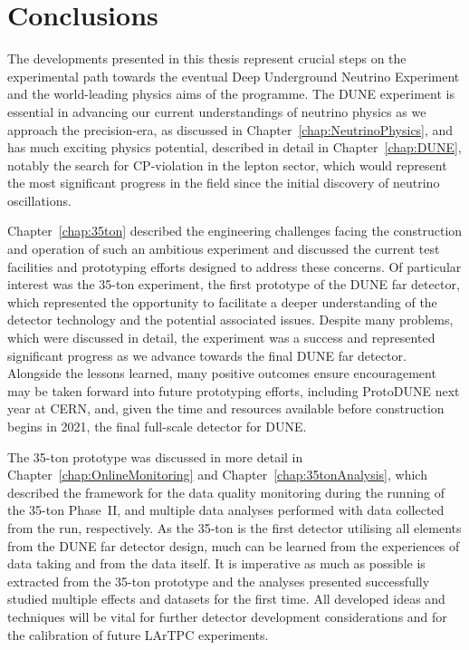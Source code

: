 
\chapter{Conclusions}\label{chap:Conclusions}

The developments presented in this thesis represent crucial steps on the experimental path towards the eventual Deep Underground Neutrino Experiment and the world-leading physics aims of the programme.  The DUNE experiment is essential in advancing our current understandings of neutrino physics as we approach the precision-era, as discussed in Chapter~\ref{chap:NeutrinoPhysics}, and has much exciting physics potential, described in detail in Chapter~\ref{chap:DUNE}, notably the search for CP-violation in the lepton sector, which would represent the most significant progress in the field since the initial discovery of neutrino oscillations.

Chapter~\ref{chap:35ton} described the engineering challenges facing the construction and operation of such an ambitious experiment and discussed the current test facilities and prototyping efforts designed to address these concerns.  Of particular interest was the 35-ton experiment, the first prototype of the DUNE far detector, which represented the opportunity to facilitate a deeper understanding of the detector technology and the potential associated issues.  Despite many problems, which were discussed in detail, the experiment was a success and represented significant progress as we advance towards the final DUNE far detector.  Alongside the lessons learned, many positive outcomes ensure encouragement may be taken forward into future prototyping efforts, including ProtoDUNE next year at CERN, and, given the time and resources available before construction begins in 2021, the final full-scale detector for DUNE.

The 35-ton prototype was discussed in more detail in Chapter~\ref{chap:OnlineMonitoring} and Chapter~\ref{chap:35tonAnalysis}, which described the framework for the data quality monitoring during the running of the 35-ton Phase~II, and multiple data analyses performed with data collected from the run, respectively.  As the 35-ton is the first detector utilising all elements from the DUNE far detector design, much can be learned from the experiences of data taking and from the data itself.  It is imperative as much as possible is extracted from the 35-ton prototype and the analyses presented successfully studied multiple effects and datasets for the first time.  All developed ideas and techniques will be vital for further detector development considerations and for the calibration of future LArTPC experiments.

